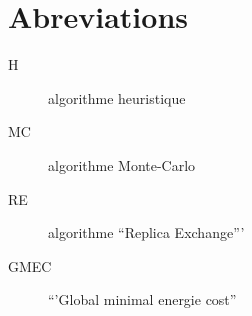 \chapter*{Abreviations}

\begin{multicols}{2}

\begin{description}
\item[H] algorithme heuristique
\item[MC] algorithme Monte-Carlo
\item[RE] algorithme ``Replica Exchange'''
\item[GMEC] ``'Global minimal energie cost''
\end{description}

\end{multicols}

